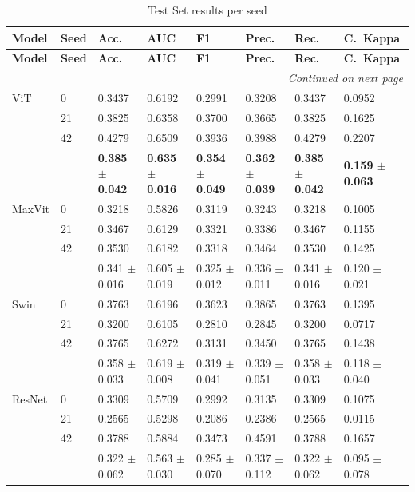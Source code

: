 \documentclass[a4paper,10pt]{book}
\begin{document}
\begin{scriptsize}
\begin{longtable}{@{}l p{1.5cm} p{1.5cm} p{1.5cm} p{1.5cm} p{1.5cm} p{1.5cm} p{1.5cm}@{}}
\caption[Test results per seed]{Test Set results per seed}
\label{tab:test_set_results} \\
\toprule
\textbf{Model} & \textbf{Seed} &
\textbf{Acc.} & \textbf{AUC} & \textbf{F1} &
\textbf{Prec.} & \textbf{Rec.} & \textbf{C.\ Kappa}\\
\midrule
\endfirsthead

\toprule
\textbf{Model} & \textbf{Seed} &
\textbf{Acc.} & \textbf{AUC} & \textbf{F1} &
\textbf{Prec.} & \textbf{Rec.} & \textbf{C.\ Kappa}\\
\midrule
\endhead

\midrule
\multicolumn{8}{r}{\textit{Continued on next page}}\\
\midrule
\endfoot

\bottomrule
\endlastfoot
ViT     & 0  & 0.3437 & 0.6192 & 0.2991 & 0.3208 & 0.3437 & 0.0952 \\ 
        & 21 & 0.3825 & 0.6358 & 0.3700 & 0.3665 & 0.3825 & 0.1625 \\ 
        & 42 & 0.4279 & 0.6509 & 0.3936 & 0.3988 & 0.4279 & 0.2207 \\ 
        &    & \textbf{0.385 $\pm$ 0.042} & \textbf{0.635 $\pm$ 0.016} & \textbf{0.354 $\pm$ 0.049} & \textbf{0.362 $\pm$ 0.039} & \textbf{0.385 $\pm$ 0.042} & \textbf{0.159 $\pm$ 0.063} \\ 
MaxVit  & 0  & 0.3218 & 0.5826 & 0.3119 & 0.3243 & 0.3218 & 0.1005 \\ 
        & 21 & 0.3467 & 0.6129 & 0.3321 & 0.3386 & 0.3467 & 0.1155 \\ 
        & 42 & 0.3530 & 0.6182 & 0.3318 & 0.3464 & 0.3530 & 0.1425 \\ 
        &    & 0.341 $\pm$ 0.016 & 0.605 $\pm$ 0.019 & 0.325 $\pm$ 0.012 & 0.336 $\pm$ 0.011 & 0.341 $\pm$ 0.016 & 0.120 $\pm$ 0.021 \\ 
Swin    & 0  & 0.3763 & 0.6196 & 0.3623 & 0.3865 & 0.3763 & 0.1395 \\ 
        & 21 & 0.3200 & 0.6105 & 0.2810 & 0.2845 & 0.3200 & 0.0717 \\ 
        & 42 & 0.3765 & 0.6272 & 0.3131 & 0.3450 & 0.3765 & 0.1438 \\ 
        &    & 0.358 $\pm$ 0.033 & 0.619 $\pm$ 0.008 & 0.319 $\pm$ 0.041 & 0.339 $\pm$ 0.051 & 0.358 $\pm$ 0.033 & 0.118 $\pm$ 0.040 \\ 
ResNet  & 0  & 0.3309 & 0.5709 & 0.2992 & 0.3135 & 0.3309 & 0.1075 \\ 
        & 21 & 0.2565 & 0.5298 & 0.2086 & 0.2386 & 0.2565 & 0.0115 \\ 
        & 42 & 0.3788 & 0.5884 & 0.3473 & 0.4591 & 0.3788 & 0.1657 \\ 
        &    & 0.322 $\pm$ 0.062 & 0.563 $\pm$ 0.030 & 0.285 $\pm$ 0.070 & 0.337 $\pm$ 0.112 & 0.322 $\pm$ 0.062 & 0.095 $\pm$ 0.078 \\ 
\end{longtable}
\end{scriptsize}


\normalsize

\backmatter
{}


\end{document}

